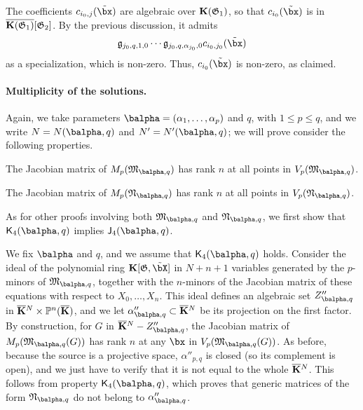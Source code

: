 \documentclass[12pt]{article}
\begin{document}
The coefficients $c_{i_0,j}(\tilde\bx)$ are algebraic over
$\mathbf{K}(\mathfrak{G}_1)$, so that $c_{i_0}(\tilde\bx)$ is in
$\overline{\mathbf{K}(\mathfrak{G}_1)}[\mathfrak{G}_2]$. By the previous 
discussion, it admits
$$ \mathfrak{g}_{j_0,q,1,0}\cdots \mathfrak{g}_{j_0,q,\alpha_{j_0},0} c_{i_0,j_0}(\tilde\bx)$$ as a
specialization, which is non-zero. Thus,  $c_{i_0}(\tilde\bx)$ 
is non-zero, as claimed.

\paragraph{Multiplicity of the solutions.} 
Again, we take parameters $\balpha=(\alpha_1,\dots,\alpha_p)$ and $q$, with $1 \le p
\le q$, and we write $N=N(\balpha,q)$ and $N'=N'(\balpha,q)$; we will prove
consider the following properties.
\begin{description}[leftmargin=*]
\item[$\assI_4(\balpha,q).$] The Jacobian matrix of
  $M_p(\mathfrak{M}_{\balpha,q})$ has rank $n$ at all points in
  $V_p(\mathfrak{M}_{\balpha,q})$.
\item[$\assJ_4(\balpha,q).$] The Jacobian matrix of
  $M_p(\mathfrak{N}_{\balpha,q})$ has rank $n$ at all points in
  $V_p(\mathfrak{N}_{\balpha,q})$.
\end{description}
As for other proofs involving both $\mathfrak{M}_{\balpha,q}$ and
$\mathfrak{N}_{\balpha,q}$, we first show that $\assJ_4(\balpha,q)$ implies
$\assI_4(\balpha,q)$.

We fix $\balpha$ and $q$, and we assume that $\assJ_4(\balpha,q)$
holds. Consider the ideal of the polynomial ring
$\KK[\mathfrak{G},\tilde\bX]$ in $N+n+1$ variables generated by the
$p$-minors of $\mathfrak{M}_{\balpha,q}$, together with the $n$-minors of
the Jacobian matrix of these equations with respect to
$X_0,\dots,X_n$. This ideal defines an algebraic set $Z''_{\balpha,q}$ in
$\overline{\mathbf{K}}{}^N \times \mathbb{P}^n(\overline{\mathbf{K}})$, and we let $\alpha''_{\balpha,q} \subset
\KKbar{}^N$ be its projection on the first factor. By construction,
for $G$ in $\KKbar{}^N-Z''_{\balpha,q}$, the Jacobian matrix of
$M_p(\mathfrak{M}_{\balpha,q}(G))$ has rank $n$ at any $\bx$ in
$V_p(\mathfrak{M}_{\balpha,q}(G))$. As before, because the source is a
projective space, $\alpha''_{p,q}$ is closed (so its complement is
open), and we just have to verify that it is not equal to the whole
$\overline{\mathbf{K}}{}^N$. This follows from property $\assJ_4(\balpha,q)$, which
proves that generic matrices of the form $\mathfrak{N}_{\balpha,q}$ do not
belong to $\alpha''_{\balpha,q}$.
\end{document}
